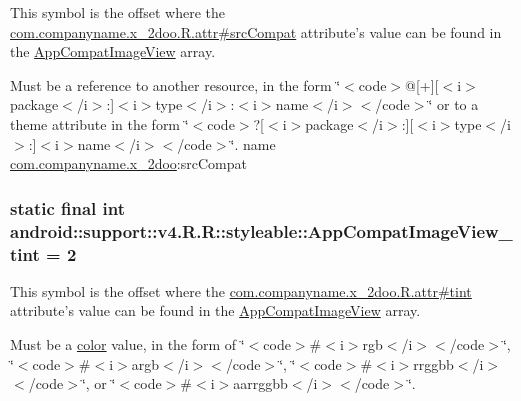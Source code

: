 This symbol is the offset where the \hyperlink{classcom_1_1companyname_1_1x__2doo_1_1_r_1_1attr_6241c33fa68aa41a7edcae8440f4f137}{com.companyname.x\_\-2doo.R.attr\#srcCompat} attribute's value can be found in the \hyperlink{classandroid_1_1support_1_1v4_1_1_r_1_1styleable_6785f800ea84c577c1f75fe389b114f0}{AppCompatImageView} array.

Must be a reference to another resource, in the form \char`\"{}$<$code$>$@\mbox{[}+\mbox{]}\mbox{[}$<$i$>$package$<$/i$>$:\mbox{]}$<$i$>$type$<$/i$>$:$<$i$>$name$<$/i$>$$<$/code$>$\char`\"{} or to a theme attribute in the form \char`\"{}$<$code$>$?\mbox{[}$<$i$>$package$<$/i$>$:\mbox{]}\mbox{[}$<$i$>$type$<$/i$>$:\mbox{]}$<$i$>$name$<$/i$>$$<$/code$>$\char`\"{}.  name \hyperlink{namespacecom_1_1companyname_1_1x__2doo}{com.companyname.x\_\-2doo}:srcCompat \hypertarget{classandroid_1_1support_1_1v4_1_1_r_1_1styleable_5a59812d29ed00b03e0455481efa5f47}{
\subsubsection[{AppCompatImageView\_\-tint}]{\setlength{\rightskip}{0pt plus 5cm}static final int android::support::v4.R.R::styleable::AppCompatImageView\_\-tint = 2}}
\label{classandroid_1_1support_1_1v4_1_1_r_1_1styleable_5a59812d29ed00b03e0455481efa5f47}


This symbol is the offset where the \hyperlink{classcom_1_1companyname_1_1x__2doo_1_1_r_1_1attr_80a740d9824a3b6ca2a2cd6aa7e45000}{com.companyname.x\_\-2doo.R.attr\#tint} attribute's value can be found in the \hyperlink{classandroid_1_1support_1_1v4_1_1_r_1_1styleable_6785f800ea84c577c1f75fe389b114f0}{AppCompatImageView} array.

Must be a \hyperlink{classandroid_1_1support_1_1v4_1_1_r_1_1color}{color} value, in the form of \char`\"{}$<$code$>$\#$<$i$>$rgb$<$/i$>$$<$/code$>$\char`\"{}, \char`\"{}$<$code$>$\#$<$i$>$argb$<$/i$>$$<$/code$>$\char`\"{}, \char`\"{}$<$code$>$\#$<$i$>$rrggbb$<$/i$>$$<$/code$>$\char`\"{}, or \char`\"{}$<$code$>$\#$<$i$>$aarrggbb$<$/i$>$$<$/code$>$\char`\"{}. 

